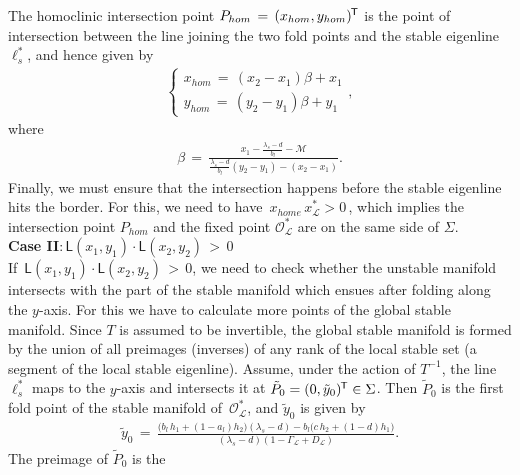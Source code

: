 \documentclass{article}
\theoremstyle{example}
\theoremstyle{plain}
\theoremstyle{definition}
\theoremstyle{remark}
\newcommand*{\tran}{^{\mkern-1.5mu\mathsf{T}}}
\begin{document}
The homoclinic intersection point $P_{hom}\, = \, (x_{hom}, y_{hom})\tran$ is the point of intersection between
the line joining the two fold points and the stable eigenline $\boldsymbol\ell^{*}_{s}$, and hence given by
\begin{align}
 \begin{cases}
 x_{hom}\, =\, (x_2-x_1)\beta +x_1
 \\[1ex]
 y_{hom}\, =\, (y_2-y_1)\beta +y_1
 \end{cases},   
\end{align}
where 
\begin{align}
\beta \, = \, \frac{x_1-\frac{\lambda_{s}-d}{b_l}-\mathcal{M}}{\frac{\lambda_{s}-d}{b_l}(y_2-y_1)-(x_2-x_1)}.    
\end{align}
Finally, we must ensure that the intersection happens before the stable eigenline hits the border.  
For this, we need to have $\, x_{home}\, x^{*}_{\mathcal{L}}>0 \,$, which implies the intersection point $P_{hom}$ and the fixed point $\mathcal{O}^{*}_{\mathcal{L}}$ are on the same side of $\Sigma$.
~\\[2ex]
\textbf{Case II}:$\,\mathsf{L}(x_1,y_1)  \cdot  \mathsf{L}(x_2,y_2) \, > \,  0$\\[2ex]
%
If $\,\mathsf{L}(x_1,y_1)  \cdot  \mathsf{L}(x_2,y_2) \, > \,  0$, 
we need to check whether the unstable manifold intersects with the part of the stable manifold which ensues after folding along the $y$-axis. For this we %
have to calculate more points of the global stable manifold. Since $T$ is assumed to be invertible, the global stable manifold is formed by the union of all preimages (inverses) of any rank of the local stable set (a segment of the local stable eigenline). Assume, under the action of $T^{-1}$, the line $\boldsymbol\ell^{*}_{s}$ maps to the $y$-axis and intersects it at $\tilde{P}_0 =(0, \tilde{y}_0)\tran \in \Sigma$. Then $\tilde{P}_0$ is the first fold point of the stable manifold of $\,\mathcal{O}^{*}_{\mathcal{L}}$, and $\tilde{y}_0$ is given by
    \begingroup
\allowdisplaybreaks
    \begin{align}
     \tilde{y}_0 \, = \, \frac{\big(b_l\,h_1 + (1-a_l)h_2\big)(\lambda_{s}-d)- b_l\big(c\,h_2 + (1 - d)h_1\big) }{(\lambda_{s}-d)(1-\Gamma_{\mathcal{L}}+D_{\mathcal{L}})}.   
    \end{align}
    \endgroup
The preimage of $\tilde{P}_0$ is the
\end{document}
